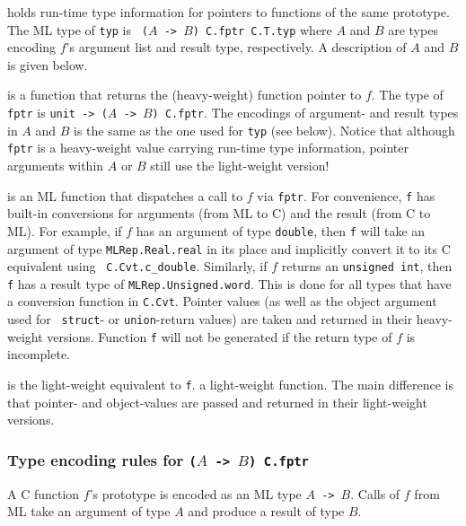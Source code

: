\documentclass[titlepage,letterpaper]{article}
\begin{document}
\begin{description}\setlength{\itemsep}{0pt}
\item[{\tt val typ}] holds run-time type information for pointers to
  functions of the same prototype.  The ML type of {\tt typ} is {\tt
    ($A$ -> $B$) C.fptr C.T.typ} where $A$ and $B$ are types encoding
  $f$'s argument list and result type, respectively.  A
  description of $A$ and $B$ is given below.
\item[{\tt val fptr}] is a function that returns the (heavy-weight)
  function pointer to $f$. The type of {\tt fptr} is {\tt unit -> ($A$
    -> $B$) C.fptr}.  The encodings of argument- and result types in
  $A$ and $B$ is the same as the one used for {\tt typ} (see below).
  Notice that although {\tt fptr} is a heavy-weight value carrying
  run-time type information, pointer arguments within $A$ or $B$ still
  use the light-weight version!
\item[!{\tt val f}] is an ML function that dispatches a call to $f$
  via {\tt fptr}.  For convenience, {\tt f} has built-in conversions
  for arguments (from ML to C) and the result (from C to ML).  For
  example, if $f$ has an argument of type {\tt double}, then {\tt f}
  will take an argument of type {\tt MLRep.Real.real} in its place and
  implicitly convert it to its C equivalent using {\tt
    C.Cvt.c\_double}.  Similarly, if $f$ returns an {\tt unsigned
    int}, then {\tt f} has a result type of {\tt MLRep.Unsigned.word}.
  This is done for all types that have a conversion function in
  {\tt C.Cvt}.
  Pointer values (as well as the object argument used for {\tt
    struct}- or {\tt union}-return values) are taken and returned in
  their heavy-weight versions.  Function {\tt f} will not be generated
  if the return type of $f$ is incomplete.
\item[{\tt val f'}] is the light-weight equivalent to {\tt f}.  a
  light-weight function.  The main difference is that pointer- and
  object-values are passed and returned in their light-weight
  versions.
\end{description}

\subsubsection*{Type encoding rules for {\tt ($A$ -> $B$) C.fptr}}

A C function $f$'s prototype is encoded as an ML type {\tt $A$ ->
  $B$}.  Calls of $f$ from ML take an argument of type $A$ and
produce a result of type $B$.
\end{document}
